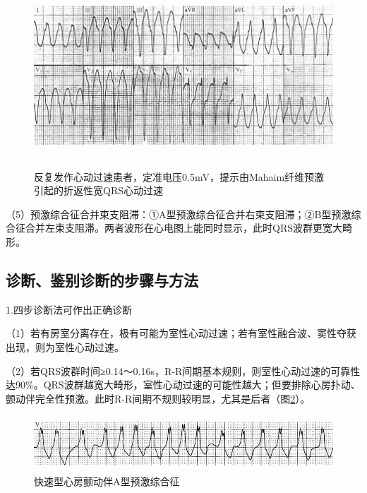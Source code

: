 \begin{figure}[!htbp]
 \centering
 \includegraphics[width=5.78125in,height=2.69792in]{./images/Image00510.jpg}
 \captionsetup{justification=centering}
 \caption{反复发作心动过速患者，定准电压0.5mV，提示由Mahaim纤维预激引起的折返性宽QRS心动过速}
 \label{fig31-7}
  \end{figure} 

（5）预激综合征合并束支阻滞：①A型预激综合征合并右束支阻滞；②B型预激综合征合并左束支阻滞。两者波形在心电图上能同时显示，此时QRS波群更宽大畸形。

\protect\hypertarget{text00038.htmlux5cux23subid438}{}{}

\subsection{诊断、鉴别诊断的步骤与方法}

1.四步诊断法可作出正确诊断

（1）若有房室分离存在，极有可能为室性心动过速；若有室性融合波、窦性夺获出现，则为室性心动过速。

（2）若QRS波群时间≥0.14～0.16s，R-R间期基本规则，则室性心动过速的可靠性达90\%。QRS波群越宽大畸形，室性心动过速的可能性越大；但要排除心房扑动、颤动伴完全性预激。此时R-R间期不规则较明显，尤其是后者（图\ref{fig31-8}）。

\begin{figure}[!htbp]
 \centering
 \includegraphics[width=5.58333in,height=0.82292in]{./images/Image00511.jpg}
 \captionsetup{justification=centering}
 \caption{快速型心房颤动伴A型预激综合征}
 \label{fig31-8}
  \end{figure} 

